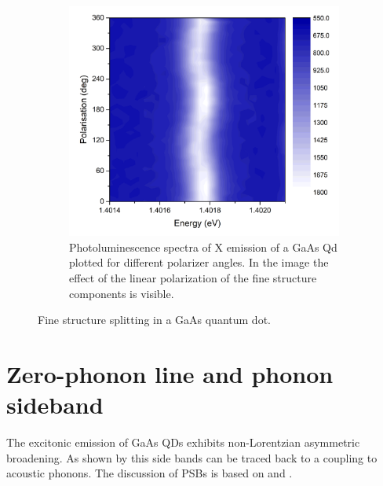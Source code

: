\begin{figure}[H]
\begin{subfigure}[b]{0.48\textwidth}
		\includegraphics[width=1.05\textwidth]{figures/quantum-dot/FSS_Pol.png}
		\caption{Photoluminescence spectra of X emission of a GaAs Qd plotted for different polarizer angles.
		In the image the effect of the linear polarization of the fine structure components is visible.~\cite{schimpf_towards_2017}}
		\label{fig:fss-pol}
	\end{subfigure}
	\caption{Fine structure splitting in a GaAs quantum dot.}
	\label{fig:fss}
\end{figure}

\section{Zero-phonon line and phonon sideband}
\label{sec:zero-phonon-side-band}
The excitonic emission of \ac{GaAs} \acp{QD} exhibits non-Lorentzian asymmetric broadening. As shown by \textcite{peter_phonon_2004} this side bands can be traced back to a coupling to acoustic phonons.
The discussion of \acp{PSB} is based on \textcite{friedrich_photochemical_1984} and  \textcite{peter_phonon_2004}.

